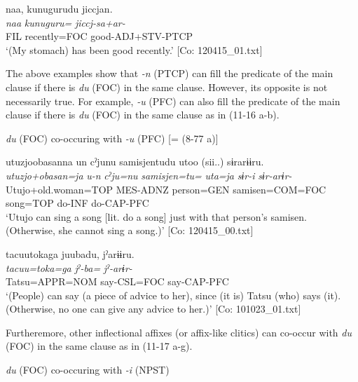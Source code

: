  \ex{}

    
      \glll    naa,  kunugurudu  jiccjan.\\
      \textit{naa}  \textit{kunuguru=}  \textit{jiccj-sa+ar-}\\
      FIL  recently=FOC  good-ADJ+STV-PTCP\\
    \glt       ‘(My stomach) has been good recently.’ [Co: 120415\_01.txt]
\z
\z

The above examples show that \textit{-n} (PTCP) can fill the predicate of the main clause if there is \textit{du} (FOC) in the same clause. However, its opposite is not necessarily true. For example, \textit{{}-u} (PFC) can also fill the predicate of the main clause if there is \textit{du} (FOC) in the same clause as in (11-16 a-b).

\ea\label{ex:11-16}  \textit{du} (FOC) co-occuring with \textit{{}-u} (PFC) [= (8-77 a)]

  \ea  
      \glll    utuzjoobasanna  un  cˀjunu  samisjentudu  utoo  (sii..)  sɨrarɨɨru.  \\
      \textit{utuzjo+obasan=ja}  \textit{u-n}  \textit{cˀju=nu}  \textit{samisjen=tu=}  \textit{uta=ja}  \textit{sɨr-i}  \textit{sɨr-arɨr-}  \\
      Utujo+old.woman=TOP  MES-ADNZ  person=GEN  samisen=COM=FOC song=TOP  do-INF  do-CAP-PFC  \\
      \glt       ‘Utujo can sing a song [lit. do a song] just with that person’s samisen. (Otherwise, she cannot sing a song.)’ [Co: 120415\_00.txt]

  \ex  
      \glll    tacuu{\textbar}toka{\textbar}ga  juubadu,  jˀarɨɨru.\\
      \textit{tacuu=toka=ga}  \textit{jˀ-ba=}  \textit{jˀ-arɨr-}\\
      Tatsu=APPR=NOM  say-CSL=FOC  say-CAP-PFC\\
      \glt       ‘(People) can say (a piece of advice to her), since (it is) Tatsu (who) says (it). (Otherwise, no one can give any advice to her.)’ [Co: 101023\_01.txt]
\z
\z

  Furtheremore, other inflectional affixes (or affix-like clitics) can co-occur with \textit{du} (FOC) in the same clause as in (11-17 a-g).

\ea\label{ex:11-17}  \ea \textit{du} (FOC) co-occuring with \textit{{}-i} (NPST)

